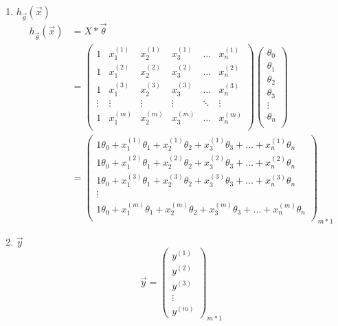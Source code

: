 \begin{enumerate}
\item $h_{\vec{\theta}}(\vec{x})$
\begin{equation}\begin{aligned}
	h_{\vec{\theta}}(\vec{x}) &= X * \vec{\theta} \\
	    & = \left(\begin{matrix}
			1 & x_1^{(1)} & x_2^{(1)} & x_3^{(1)} & \dots & x_n^{(1)} \\
			1 & x_1^{(2)} & x_2^{(2)} & x_3^{(2)} & \dots & x_n^{(2)} \\
			1 & x_1^{(3)} & x_2^{(3)} & x_3^{(3)} & \dots & x_n^{(3)} \\
			\vdots    & \vdots    & \vdots    & \vdots    & \ddots & \vdots   \\
			1 & x_1^{(m)} & x_2^{(m)} & x_3^{(m)} & \dots & x_n^{(m)} \\
		\end{matrix}\right)
		\left(\begin{matrix}
			\theta_0 \\ \theta_1 \\ \theta_2 \\ \theta_3 \\ \vdots \\ \theta_n \\
		\end{matrix}\right) \\
		& = \left(\begin{matrix}
			1\theta_0 + x_1^{(1)}\theta_1 + x_2^{(1)}\theta_2 + x_3^{(1)}\theta_3 + \dots + x_n^{(1)}\theta_n \\
			1\theta_0 + x_1^{(2)}\theta_1 + x_2^{(2)}\theta_2 + x_3^{(2)}\theta_3 + \dots + x_n^{(2)}\theta_n \\
			1\theta_0 + x_1^{(3)}\theta_1 + x_2^{(3)}\theta_2 + x_3^{(3)}\theta_3 + \dots + x_n^{(3)}\theta_n \\
			\vdots \\
			1\theta_0 + x_1^{(m)}\theta_1 + x_2^{(m)}\theta_2 + x_3^{(m)}\theta_3 + \dots + x_n^{(m)}\theta_n \\
		\end{matrix}\right)_{m*1}
\end{aligned}\end{equation}

\item $\vec{y}$
\begin{equation}
	\vec{y} = \left(\begin{matrix}
		y^{(1)} \\ y^{(2)} \\ y^{(3)} \\ \vdots \\ y^{(m)}
	\end{matrix}\right)_{m*1}
\end{equation}
\end{enumerate}

